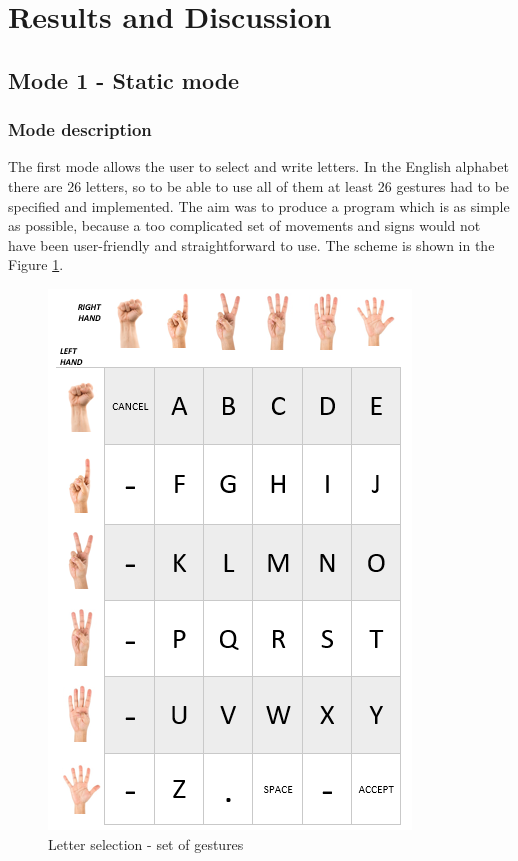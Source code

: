 \section{Results and Discussion}
\subsection{Mode 1 - Static mode}
\subsubsection {Mode description}
The first mode allows the user to select and write letters. In the English alphabet there are 26 letters, so to be able to use all of them at least 26 gestures had to be specified and implemented. The aim was to produce a program which is as simple as possible, because a too complicated set of movements and signs would not have been user-friendly and straightforward to use. The scheme is shown in the Figure \ref{fig:letters}.

\begin{figure}[H]
	\includegraphics{static_gestures}
	\centering
	\caption{Letter selection - set of gestures}
	\label{fig:letters}
\end{figure}

